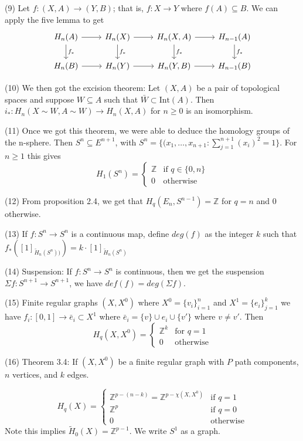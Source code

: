 \documentclass{article}
\begin{document}
(9) Let $f: (X,A) \to (Y,B)$; that is, $f:X \to Y$ where $f(A) \subseteq B$. We can apply the five lemma to get
\[
\begin{tikzcd}
H_n(A) \arrow[r] \arrow[d, "f_*"] & H_n(X) \arrow[r] \arrow[d, "f_*"] & H_n(X,A) \arrow[r] \arrow[d, "f_*"] & H_{n-1}(A) \arrow[d, "f_*"]\\
H_n(B) \arrow[r] & H_n(Y) \arrow[r] & H_n(Y, B) \arrow[r] & H_{n-1}(B) 
\end{tikzcd}
\]

(10) We then got the excision theorem: Let $(X,A)$ be a pair of topological spaces and suppose $W \subseteq A$ such that $\bar{W} \subset \text{Int}(A)$. Then $i_*: H_n(X \sim W, A \sim W) \to H_n(X,A)$ for $n \geq 0$  is an isomorphism.

(11) Once we got this theorem, we were able to deduce the homology groups of the n-sphere. Then $S^n \subseteq E^{n+1}$, with $S^n = \{(x_1, \ldots, x_{n+1}: \sum_{j=1}^{n+1} (x_i)^2 = 1 \}$. For $n \geq 1$ this gives
\[
H_1(S^n) =
  \begin{cases}
   \mathbb{Z} & \text{if } q \in \{0, n \} \\
   0       & \text{otherwise}
  \end{cases}
\]

(12) From proposition 2.4, we get that $H_q(E_n, S^{n-1}) = \mathbb{Z}$ for $q=n$ and 0 otherwise.

(13) If $f: S^n \to S^n$ is a continuous map, define $deg(f)$ as the integer $k$ such that $f_*([1]_{\tilde{H}_n(S^n))}) = k \cdot [1]_{\tilde{H}_n(S^n)}$

(14) Suspension: If $f: S^n \to S^n$ is continuous, then we get the suspension $\Sigma f: S^{n+1} \to S^{n+1}$, we have $def(f) = deg(\Sigma f)$.

(15) Finite regular graphs $(X, X^0)$ where $X^0 = \{ v_i \}_{i=1}^n$ and $X^1 = \{ e_i \}^k_{j=1}$ we have $f_i: [0,1] \to \bar{e}_i \subset X^1$ where $ \bar{e}_i = \{ v \} \cup e_i \cup \{ v' \}$ where $v \neq v'$. Then
\[
H_q(X, X^0) =
\begin{cases}
\mathbb{Z}^k & \text{for } q = 1\\
0 & \text{otherwise}
\end{cases}
\]

(16) Theorem 3.4: If $(X, X^0)$ be a finite regular graph with $P$ path components, $n$ vertices, and $k$ edges.

\[
H_q(X) =
\begin{cases}
\mathbb{Z}^{p - (n - k)} = \mathbb{Z}^{p - \chi(X,X^0)} & \text{if } q = 1 \\
\mathbb{Z}^p & \text{if } q = 0 \\
0 & \text{otherwise}
\end{cases}
\]
Note this implies $\tilde{H}_0(X) = \mathbb{Z}^{p-1}$. We write $S^1$ as a graph.
\end{document}
